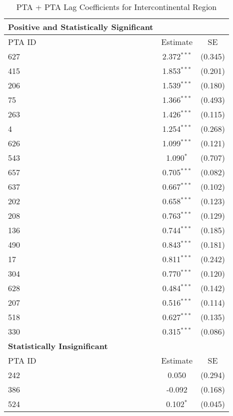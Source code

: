 \begin{table}[htbp]
    \centering
    \caption{PTA + PTA Lag Coefficients for Intercontinental Region}
    \label{tab:pta_intercontinental}
    \begin{adjustbox}{max width=\textwidth}
    \begin{tabular}{lcc}
    \hline
    \textbf{Positive and Statistically Significant} &  &  \\
    \hline
    PTA ID & Estimate & SE \\
    \hline
    627 & 2.372$^{\ast\ast\ast}$ & (0.345) \\
    415 & 1.853$^{\ast\ast\ast}$ & (0.201) \\
    206 & 1.539$^{\ast\ast\ast}$ & (0.180) \\
    75  & 1.366$^{\ast\ast\ast}$ & (0.493) \\
    263 & 1.426$^{\ast\ast\ast}$ & (0.115) \\
    4   & 1.254$^{\ast\ast\ast}$ & (0.268) \\
    626 & 1.099$^{\ast\ast\ast}$ & (0.121) \\
    543 & 1.090$^{\ast}$ & (0.707) \\
    657 & 0.705$^{\ast\ast\ast}$ & (0.082) \\
    637 & 0.667$^{\ast\ast\ast}$ & (0.102) \\
    202 & 0.658$^{\ast\ast\ast}$ & (0.123) \\
    208 & 0.763$^{\ast\ast\ast}$ & (0.129) \\
    136 & 0.744$^{\ast\ast\ast}$ & (0.185) \\
    490 & 0.843$^{\ast\ast\ast}$ & (0.181) \\
    17  & 0.811$^{\ast\ast\ast}$ & (0.242) \\
    304 & 0.770$^{\ast\ast\ast}$ & (0.120) \\
    628 & 0.484$^{\ast\ast\ast}$ & (0.142) \\
    207 & 0.516$^{\ast\ast\ast}$ & (0.114) \\
    518 & 0.627$^{\ast\ast\ast}$ & (0.135) \\
    330 & 0.315$^{\ast\ast\ast}$ & (0.086) \\
    \hline
    \textbf{Statistically Insignificant} &  &  \\
    \hline
    PTA ID & Estimate & SE \\
    \hline
    242 & 0.050 & (0.294) \\
    386 & -0.092 & (0.168) \\
    524 & 0.102$^{\ast}$ & (0.045) \\

\end{tabular}
\end{adjustbox}
\end{table}
